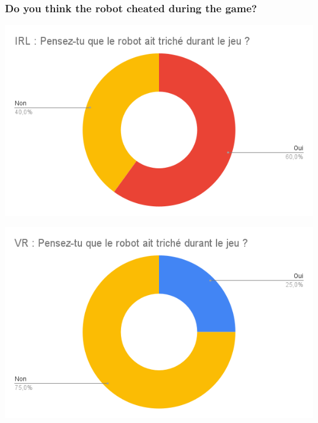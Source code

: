     \subsubsection{Do you think the robot cheated during the game?}
    \begin{minipage}{.5\textwidth}%
    \includegraphics[width=\textwidth]{Datas_childs/IRL_triche_pendant_jeu.png}
    \end{minipage}%
    \begin{minipage}{.5\textwidth}%
    \includegraphics[width=\textwidth]{Datas_childs/VR_triche_pendant_jeu.png}
    \end{minipage}%
    \vspace*{0.5cm}
\newpage
